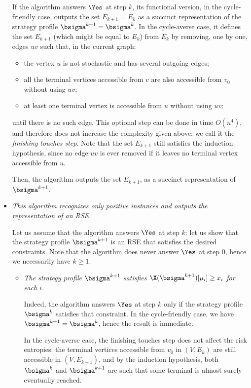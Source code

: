 \begin{itemize}
        If the algorithm answers $\Yes$ at step $k$, its functional version, in the cycle-friendly case, outputs the set $E_{k+1} = E_k$ as a succinct representation of the strategy profile $\bsigma^{k+1} = \bsigma^k$.
        In the cycle-averse case, it defines the set $E_{k+1}$ (which might be equal to $E_k$) from $E_k$ by removing, one by one, edges $uv$ such that, in the current graph:
        \begin{itemize}
            \item the vertex $u$ is not stochastic and has several outgoing edges;
            \item all the terminal vertices accessible from $v$ are also accessible from $v_0$ without using $uv$;
            \item at least one terminal vertex is accessible from $u$ without using $uv$;
        \end{itemize}
        until there is no such edge.
        This optional step can be done in time $O(n^4)$, and therefore does not increase the complexity given above: we call it the \emph{finishing touches step}.
        Note that the set $E_{k+1}$ still satisfies the induction hypothesis, since no edge $uv$ is ever removed if it leaves no terminal vertex accessible from $u$.
        
        Then, the algorithm outputs the set $E_{k+1}$, as a succinct representation of $\bsigma^{k+1}$.
        

        \item \emph{This algorithm recognizes only positive instances and outputs the representation of an RSE.}

        Let us assume that the algorithm answers $\Yes$ at step $k$: let us show that the strategy profile $\bsigma^{k+1}$ is an RSE that satisfies the desired constraints.
        Note that the algorithm does never answer $\Yes$ at step $0$, hence we necessarily have $k \geq 1$.

        \begin{itemize}
            \item \emph{The strategy profile $\bsigma^{k+1}$ satisfies $\X({\bsigma^{k+1}})[\mu_i] \geq x_i$ for each $i$.}

            Indeed, the algorithm answers $\Yes$ at step $k$ only if the strategy profile $\bsigma^k$ satisfies that constraint.
        In the cycle-friendly case, we have $\bsigma^{k+1} = \bsigma^k$, hence the result is immediate.
        
        In the cycle-averse case, the finishing touches step does not affect the risk entropies: the terminal vertices accessible from $v_0$ in $(V, E_k)$ are still accessible in $(V, E_{k+1})$, and by the induction hypothesis, both $\bsigma^k$ and $\bsigma^{k+1}$ are such that some terminal is almost surely eventually reached.


\end{itemize}
\end{itemize}
